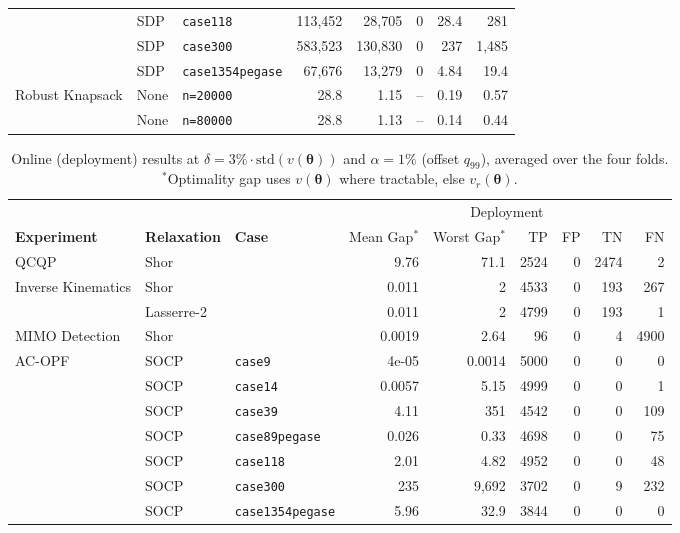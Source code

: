 \documentclass[10pt]{article} %
\theoremstyle{plain}
\theoremstyle{definition}
\theoremstyle{remark}
\begin{document}
\begin{table}[t]
\begin{tabular}{lll rr r r r}
   & SDP & \texttt{case118} & 113,452 & 28,705 & 0 & 28.4 & 281 \\
   & SDP & \texttt{case300} & 583,523 & 130,830 & 0 & 237 & 1,485 \\
   & SDP & \texttt{case1354pegase} & 67,676 & 13,279 & 0 & 4.84 & 19.4 \\
\midrule
  \multirow{2}{*}{Robust Knapsack} & None & \texttt{n=20000} & 28.8 & 1.15 & -- & 0.19 & 0.57 \\
   & None & \texttt{n=80000} & 28.8 & 1.13 & -- & 0.14 & 0.44 \\
\bottomrule
\end{tabular}
\end{table}

\begin{table}[t]
\centering\footnotesize
\caption{Online (deployment) results at $\delta = 3\%\cdot\mathrm{std}(v(\bm{\theta}))$ and
$\alpha = 1\%$ (offset $q_{99}$), averaged over the four folds. ${}^\ast$Optimality gap uses
$v(\bm{\theta})$ where tractable, else $v_r(\bm{\theta})$.}
\label{tab:online}
\begin{tabular}{lll rr rrrr}
\toprule
& & & \multicolumn{6}{c}{Deployment} \\
\cmidrule(lr){4-9}
\textbf{Experiment} & \textbf{Relaxation} & \textbf{Case} &
Mean Gap$^\ast$ & Worst Gap$^\ast$ & TP & FP & TN & FN \\
\midrule
  \multirow{1}{*}{QCQP} & Shor &  & 9.76 & 71.1 & 2524 & 0 & 2474 & 2 \\
\midrule
  \multirow{2}{*}{Inverse Kinematics} & Shor &  & 0.011 & 2 & 4533 & 0 & 193 & 267 \\
   & Lasserre-2 &  & 0.011 & 2 & 4799 & 0 & 193 & 1 \\
\midrule
  \multirow{1}{*}{MIMO Detection} & Shor &  & 0.0019 & 2.64 & 96 & 0 & 4 & 4900 \\
\midrule
  \multirow{15}{*}{AC-OPF} & SOCP & \texttt{case9} & 4e-05 & 0.0014 & 5000 & 0 & 0 & 0 \\
   & SOCP & \texttt{case14} & 0.0057 & 5.15 & 4999 & 0 & 0 & 1 \\
   & SOCP & \texttt{case39} & 4.11 & 351 & 4542 & 0 & 0 & 109 \\
   & SOCP & \texttt{case89pegase} & 0.026 & 0.33 & 4698 & 0 & 0 & 75 \\
   & SOCP & \texttt{case118} & 2.01 & 4.82 & 4952 & 0 & 0 & 48 \\
   & SOCP & \texttt{case300} & 235 & 9,692 & 3702 & 0 & 9 & 232 \\
   & SOCP & \texttt{case1354pegase} & 5.96 & 32.9 & 3844 & 0 & 0 & 0 \\

\end{tabular}
\end{table}
\end{document}
